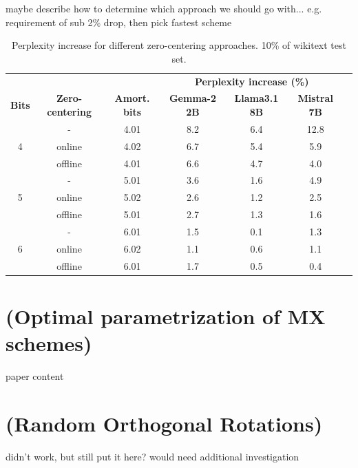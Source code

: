 maybe describe how to determine which approach we should go with... 
e.g. requirement of sub 2\% drop, then pick fastest scheme

\begin{table}[ht]
\centering
\begin{tabular}{ccccccc}
\toprule
 & & & \multicolumn{3}{c}{\textbf{Perplexity increase (\%)}}\\

 \textbf{Bits}& \textbf{Zero-centering} & \textbf{Amort. bits} & \textbf{Gemma-2 2B} & \textbf{Llama3.1 8B} & \textbf{Mistral 7B}  \\
\hline
\multirow{3}{*}{4} & - & 4.01 & 8.2   & 6.4   & 12.8   \\
 & online & 4.02 & 6.7   & 5.4   & 5.9    \\
 & offline & 4.01 & 6.6   & 4.7   & 4.0    \\ \hline
\multirow{3}{*}{5} &  - & 5.01  & 3.6   & 1.6   & 4.9    \\
 & online & 5.02 & 2.6   & 1.2   & 2.5    \\
 & offline & 5.01 & 2.7   & 1.3   & 1.6    \\ \hline
\multirow{3}{*}{6} & - & 6.01  & 1.5   & 0.1   & 1.3    \\
 & online & 6.02 & 1.1   & 0.6   & 1.1    \\
 & offline  & 6.01 & 1.7   & 0.5   & 0.4  \\
\bottomrule
\end{tabular}
\caption{Perplexity increase for different zero-centering approaches. 10\% of wikitext test set.}
\end{table}


\section{(Optimal parametrization of MX schemes)}
paper content
\section{(Random Orthogonal Rotations)}
didn't work, but still put it here? would need additional investigation
